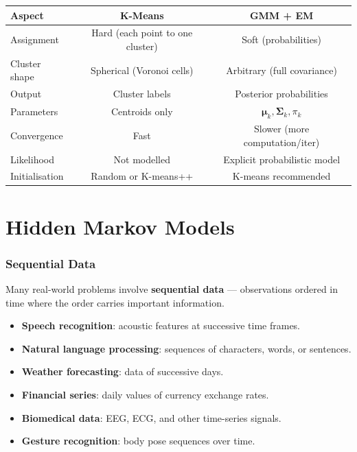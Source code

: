 \documentclass[11pt,a4paper]{article}
\theoremstyle{definition}
\theoremstyle{plain}
\theoremstyle{remark}
\begin{document}
\begin{center}
\renewcommand{\arraystretch}{1.4}
\begin{tabular}{|l|c|c|}
\hline
\textbf{Aspect} & \textbf{K-Means} & \textbf{GMM + EM} \\
\hline
Assignment & Hard (each point to one cluster) & Soft (probabilities) \\
\hline
Cluster shape & Spherical (Voronoi cells) & Arbitrary (full covariance) \\
\hline
Output & Cluster labels & Posterior probabilities \\
\hline
Parameters & Centroids only & $\boldsymbol{\mu}_k, \boldsymbol{\Sigma}_k, \pi_k$ \\
\hline
Convergence & Fast & Slower (more computation/iter) \\
\hline
Likelihood & Not modelled & Explicit probabilistic model \\
\hline
Initialisation & Random or K-means++ & K-means recommended \\
\hline
\end{tabular}
\end{center}

\newpage
\part{Hidden Markov Models}

\section{Sequential Data}

Many real-world problems involve \textbf{sequential data} --- observations ordered in time where the order carries important information.

\begin{itemize}
    \item \textbf{Speech recognition}: acoustic features at successive time frames.
    \item \textbf{Natural language processing}: sequences of characters, words, or sentences.
    \item \textbf{Weather forecasting}: data of successive days.
    \item \textbf{Financial series}: daily values of currency exchange rates.
    \item \textbf{Biomedical data}: EEG, ECG, and other time-series signals.
    \item \textbf{Gesture recognition}: body pose sequences over time.
\end{itemize}
\end{document}
